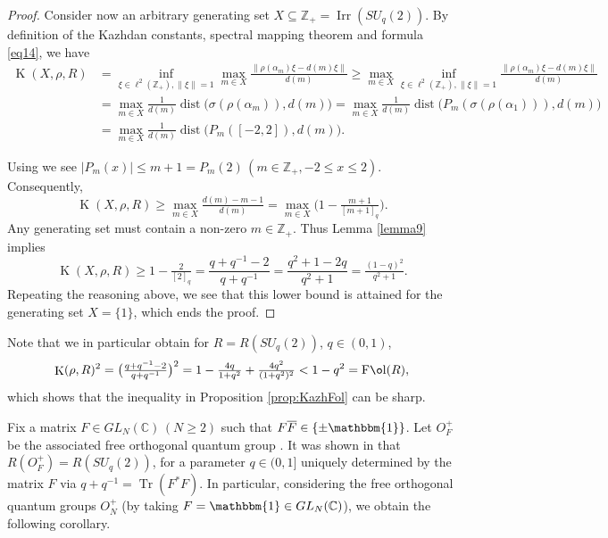 \documentclass[11 pt, leqno]{amsart}
\newcommand{\ov}{\overline}
\newcommand{\id}{\textnormal{id}}
\newcommand{\I}{\mathbbm{1}}
\newcommand{\CC}{\mathbb{C}}
\newcommand{\ZZ}{\mathbb{Z}}
\newcommand{\oon}{\operatorname}
\DeclareMathOperator{\Fol}{F\mathrm{\o}l}
\DeclareMathOperator{\Kaz}{K}
\DeclareMathOperator{\Irr}{Irr}
\DeclareMathOperator{\Tr}{Tr}
\theoremstyle{definition}
\numberwithin{equation}{section}
\begin{document}
\begin{proof}
Consider now an arbitrary generating set $X\subseteq \ZZ_+=\Irr(SU_q(2))$. By definition of the Kazhdan constants, spectral mapping theorem and formula \eqref{eq14}, we have
\[\begin{split}
\Kaz(X,\rho,R)&=\inf_{\xi\in \ell^2(\ZZ_+), \|\xi\|=1} \max_{m\in X} \tfrac{ \|\rho(\alpha_m) \xi - d(m)\xi \|}{d(m)}\ge 
 \max_{m\in X} \inf_{\xi\in \ell^2(\ZZ_+), \|\xi\|=1}\tfrac{ \|\rho(\alpha_m) \xi - d(m)\xi \|}{d(m)}\\
 &=
  \max_{m\in X} \tfrac{1}{d(m)}
  \oon{dist}\bigl(\sigma(\rho(\alpha_m) ) , d(m)\bigr)=
  \max_{m\in X} \tfrac{1}{d(m)}
  \oon{dist}\bigl(P_m(\sigma(\rho(\alpha_1) )) , d(m)\bigr)\\
  &=
  \max_{m\in X} \tfrac{1}{d(m)}
  \oon{dist}\bigl(P_m(\left[-2,2\right]) , d(m)\bigr).
 \end{split}\]

Using \cite[Section 18.7, 18.14]{NIST} we see $|P_m(x)|\le m+1=P_m(2)\,(m\in\ZZ_+, -2\le x \le 2)$. Consequently,
\begin{equation}\label{eq17}
\Kaz(X,\rho,R)\ge 
\max_{m\in X} \tfrac{d(m) -m-1}{d(m)} =
\max_{m\in X} \bigl( 1- \tfrac{m+1}{[m+1]_q}\bigr).
\end{equation}
Any generating set must contain a non-zero $m \in \mathbb{Z}_+$. Thus Lemma \ref{lemma9} implies 
 \[
\Kaz(X,\rho,R) \ge 1-\tfrac{2}{[2]_q}=
\frac{q+q^{-1}-2}{q+q^{-1}}=
\frac{q^2+1-2q}{q^2+1}=
\tfrac{(1-q)^2}{q^2+1}.
\]
Repeating the reasoning above, we see that this lower bound is attained for the generating set $X=\{1\}$, which ends the proof.
\end{proof}

Note that we in particular obtain for $R=R(SU_q(2))$, $q \in (0,1)$,
\[
 \Kaz(\rho,R)^2=\bigl(\tfrac{q+q^{-1}-2}{q+q^{-1}}\bigr)^2=
1-\tfrac{4q}{1+q^2} + \tfrac{4 q^2}{(1+q^2)^2}<1-q^2 = \Fol(R),
\]
which shows that the inequality in Proposition \ref{prop:KazhFol} can be sharp.

\medskip

Fix a matrix $F\in GL_N(\CC)\,(N \ge 2)$ such that $F \ov{F}\in \{\pm\I\}$. Let $O_F^+$ be the associated free orthogonal quantum group \cite[Example 1.1.7]{NeshveyevTuset}. It was shown in \cite{BanicaOrth} that $R(O_F^+) = R(SU_q(2))$, for a parameter $q\in (0,1]$ uniquely determined by the matrix $F$ via $q+q^{-1}=\Tr(F^*F)$.
In particular, considering the free orthogonal quantum groups $O_N^+$ (by taking $F=\I\in GL_N(\CC)$), we obtain the following corollary.
\end{document}
